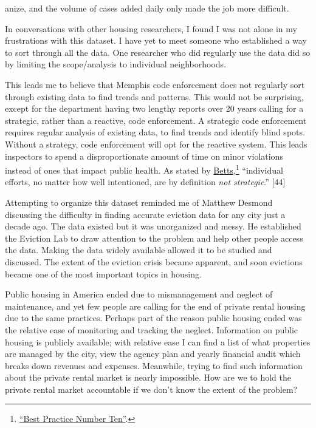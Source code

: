 \documentclass[
  openany]{book}
\begin{document}
anize, and the volume of cases added daily only made the job more difficult.

In conversations with other housing researchers, I found I was not alone in my frustrations with this dataset. I have yet to meet someone who established a way to sort through all the data. One researcher who did regularly use the data did so by limiting the scope/analysis to individual neighborhoods.

This leads me to believe that Memphis code enforcement does not regularly sort through existing data to find trends and patterns. This would not be surprising, except for the department having two lengthy reports over 20 years calling for a strategic, rather than a reactive, code enforcement. A strategic code enforcement requires regular analysis of existing data, to find trends and identify blind spots. Without a strategy, code enforcement will opt for the reactive system. This leads inspectors to spend a disproportionate amount of time on minor violations instead of ones that impact public health. As stated by \protect\hyperlink{ref-betts2001}{Betts},\footnote{\protect\hyperlink{ref-betts2001}{{``Best Practice Number Ten''}}.} ``individual efforts, no matter how well intentioned, are by definition \emph{not strategic}.'' {[}44{]}

Attempting to organize this dataset reminded me of Matthew Desmond discussing the difficulty in finding accurate eviction data for any city just a decade ago. The data existed but it was unorganized and messy. He established the Eviction Lab to draw attention to the problem and help other people access the data. Making the data widely available allowed it to be studied and discussed. The extent of the eviction crisis became apparent, and soon evictions became one of the most important topics in housing.

Public housing in America ended due to mismanagement and neglect of maintenance, and yet few people are calling for the end of private rental housing due to the same practices. Perhaps part of the reason public housing ended was the relative ease of monitoring and tracking the neglect. Information on public housing is publicly available; with relative ease I can find a list of what properties are managed by the city, view the agency plan and yearly financial audit which breaks down revenues and expenses. Meanwhile, trying to find such information about the private rental market is nearly impossible. How are we to hold the private rental market accountable if we don't know the extent of the problem?
\end{document}
